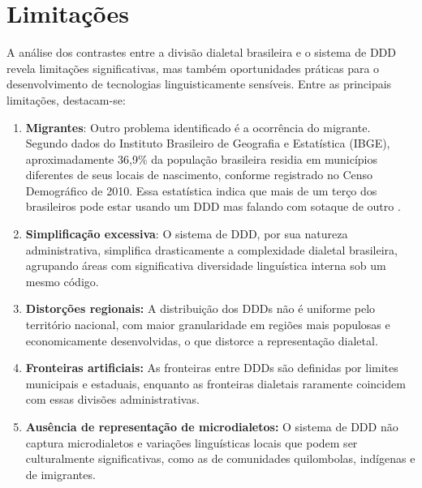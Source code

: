 \section{Limitações}
A análise dos contrastes entre a divisão dialetal brasileira e o sistema de DDD revela limitações significativas, mas também oportunidades práticas para o desenvolvimento de tecnologias linguisticamente sensíveis. Entre as principais limitações, destacam-se:
\begin{enumerate}

    \item \textbf{Migrantes}: 
Outro problema identificado é a ocorrência do migrante.
Segundo dados do Instituto Brasileiro de Geografia e Estatística (IBGE), aproximadamente 36,9\% da população brasileira residia em municípios diferentes de seus locais de nascimento, conforme registrado no Censo Demográfico de 2010. Essa estatística indica que mais de um terço dos brasileiros pode estar usando um DDD mas falando com sotaque de outro \cite{noauthor_ibge_nodate}.
    \item \textbf{Simplificação excessiva}: O sistema de DDD, por sua natureza administrativa, simplifica drasticamente a complexidade dialetal brasileira, agrupando áreas com significativa diversidade linguística interna sob um mesmo código.
    \item \textbf{Distorções regionais:} A distribuição dos DDDs não é uniforme pelo território nacional, com maior granularidade em regiões mais populosas e economicamente desenvolvidas, o que distorce a representação dialetal.
    \item \textbf{Fronteiras artificiais:} As fronteiras entre DDDs são definidas por limites municipais e estaduais, enquanto as fronteiras dialetais raramente coincidem com essas divisões administrativas.
    \item \textbf{Ausência de representação de microdialetos:} O sistema de DDD não captura microdialetos e variações linguísticas locais que podem ser culturalmente significativas, como as de comunidades quilombolas, indígenas e de imigrantes.
\end{enumerate}



